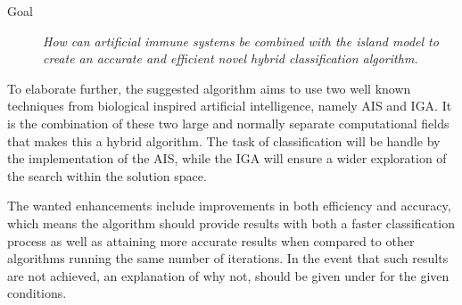 \begin{description}
\item[Goal] {\it How can artificial immune systems be combined with the island model to create an accurate and efficient novel hybrid classification algorithm.}
\end{description}
\noindent
To elaborate further, the suggested algorithm aims to use two well known techniques from biological inspired artificial intelligence, namely AIS and IGA. It is the combination of these two large and normally separate computational fields that makes this a hybrid algorithm. The task of classification will be handle by the implementation of the AIS, while the IGA will ensure a wider exploration of the search within the solution space.


The wanted enhancements include improvements in both efficiency and accuracy, which means the algorithm should provide results with both a faster classification process as well as attaining more accurate results when compared to other algorithms running the same number of iterations. In the event that such results are not achieved, an explanation of why not, should be given under for the given conditions.


